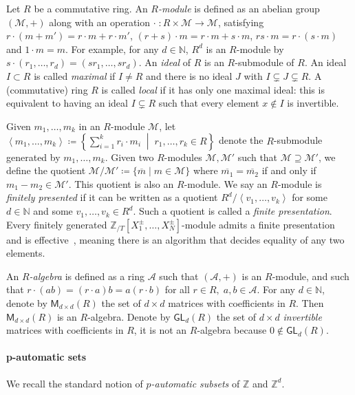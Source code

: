 \documentclass[letterpaper, 11pt, thm-restate]{article}
\numberwithin{equation}{section}
\newcommand{\Z}{\mathbb{Z}}
\newcommand{\N}{\mathbb{N}}
\newcommand{\ZT}{\mathbb{Z}_{/T}}
\newcommand{\GL}{\mathsf{GL}}
\newcommand{\mM}{\mathcal{M}}
\newcommand{\M}{\mathsf{M}}
\newcommand{\mA}{\mathcal{A}}
\newcommand{\gen}[1]{\left\langle {#1} \right\rangle}
\theoremstyle{definition}
\theoremstyle{definition}
\theoremstyle{definition}
\begin{document}
Let $R$ be a commutative ring.
An \emph{$R$-module} is defined as an abelian group $(\mM, +)$ along with an operation $\cdot \;\colon R \times \mM \rightarrow \mM$, satisfying $r \cdot (m+m') = r \cdot m + r \cdot m'$, $(r + s) \cdot m = r \cdot m + s \cdot m$, $rs \cdot m = r\cdot (s \cdot m)$ and $1 \cdot m = m$.
For example, for any $d \in \N$, $R^d$ is an $R$-module by $s \cdot (r_1, \ldots, r_d) = (sr_1, \ldots, sr_d)$.
An \emph{ideal} of $R$ is an $R$-submodule of $R$.
An ideal $I \subset R$ is called \emph{maximal} if $I \neq R$ and there is no ideal $J$ with $I \subsetneq J \subsetneq R$.
A (commutative) ring $R$ is called \emph{local} if it has only one maximal ideal: this is equivalent to having an ideal $I \subsetneq R$ such that every element $x \notin I$ is invertible.

Given $m_1, \ldots, m_k$ in an $R$-module $\mM$, let 
$
\gen{m_1, \ldots, m_k} \coloneqq \left\{\sum_{i=1}^k r_i \cdot m_i \;\middle|\; r_1, \ldots, r_k \in R\right\}
$
denote the $R$-submodule generated by $m_1, \ldots, m_k$.
Given two $R$-modules $\mM, \mM'$ such that $\mM \supseteq \mM'$, we define the quotient $\mM/\mM' \coloneqq \{\overline{m} \mid m \in \mM\}$ where $\overline{m_1} = \overline{m_2}$ if and only if $m_1 - m_2 \in \mM'$.
This quotient is also an $R$-module.
We say an $R$-module is \emph{finitely presented} if it can be written as a quotient $R^d/\gen{v_1, \ldots, v_k}$ for some $d \in \N$ and some $v_1, \ldots, v_k \in R^d$. 
Such a quotient is called a \emph{finite presentation}.
Every finitely generated $\ZT[X_1^{\pm}, \ldots, X_N^{\pm}]$-module admits a finite presentation and is effective~\cite{baumslag1981computable}, meaning there is an algorithm that decides equality of any two elements. %

An \emph{$R$-algebra} is defined as a ring $\mA$ such that $(\mA, +)$ is an $R$-module, and such that $r \cdot (ab) = (r \cdot a) b = a(r \cdot b)$ for all $r \in R, \; a, b \in \mA$.
For any $d \in \N$, denote by $\M_{d \times d}(R)$ the set of $d \times d$ matrices with coefficients in $R$. 
Then $\M_{d \times d}(R)$ is an $R$-algebra.
Denote by $\GL_d(R)$ the set of $d \times d$ \emph{invertible} matrices with coefficients in $R$, it is not an $R$-algebra because $0 \notin \GL_d(R)$.

\paragraph*{p-automatic sets}
We recall the standard notion of \emph{$p$-automatic subsets} of $\Z$ and $\Z^d$.
\end{document}
